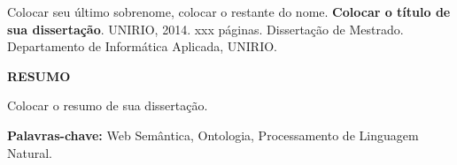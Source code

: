 Colocar seu último sobrenome, colocar o restante do nome. \textbf{Colocar o título de sua dissertação}. UNIRIO, 2014. xxx páginas. Dissertação de Mestrado. Departamento de Informática Aplicada, UNIRIO.
\vspace{60pt}
\begin{center}
    \textbf{RESUMO}
    \vspace{60pt}
\end{center}

Colocar o resumo de sua dissertação.
\vspace{20pt}

\textbf{Palavras-chave:} Web Semântica, Ontologia, Processamento de Linguagem Natural.

